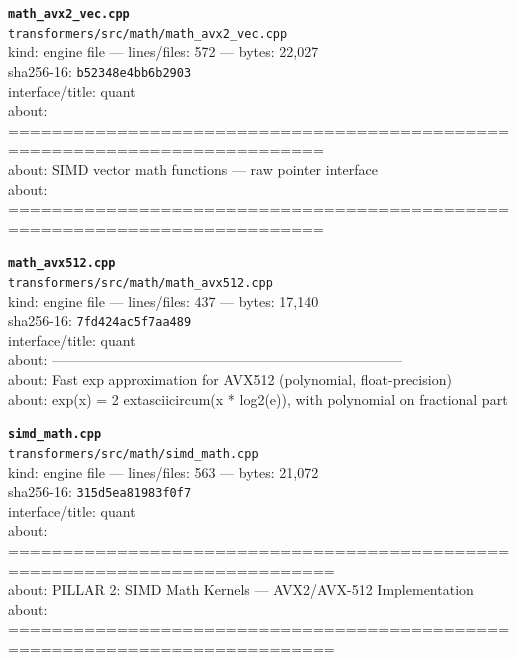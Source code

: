 \noindent\textbf{\texttt{math\_avx2\_vec.cpp}}\\
\texttt{transformers/src/math/math\_avx2\_vec.cpp}\\
kind: engine file --- lines/files: 572 --- bytes: 22,027\\
sha256-16: \texttt{b52348e4bb6b2903}\\
interface/title: quant\\
about: ===========================================================================\\
about: SIMD vector math functions — raw pointer interface\\
about: ===========================================================================\\
\vspace*{6.0pt}

\noindent\textbf{\texttt{math\_avx512.cpp}}\\
\texttt{transformers/src/math/math\_avx512.cpp}\\
kind: engine file --- lines/files: 437 --- bytes: 17,140\\
sha256-16: \texttt{7fd424ac5f7aa489}\\
interface/title: quant\\
about: ---------------------------------------------------------------------------\\
about: Fast exp approximation for AVX512 (polynomial, float-precision)\\
about: exp(x) = 2	extasciicircum{}(x * log2(e)), with polynomial on fractional part\\
\vspace*{6.0pt}

\noindent\textbf{\texttt{simd\_math.cpp}}\\
\texttt{transformers/src/math/simd\_math.cpp}\\
kind: engine file --- lines/files: 563 --- bytes: 21,072\\
sha256-16: \texttt{315d5ea81983f0f7}\\
interface/title: quant\\
about: ============================================================================\\
about: PILLAR 2: SIMD Math Kernels — AVX2/AVX-512 Implementation\\
about: ============================================================================\\
\vspace*{6.0pt}
\newpage

